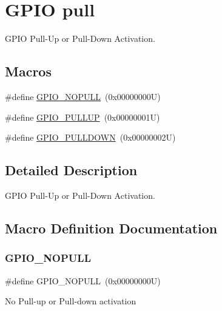 \hypertarget{group___g_p_i_o__pull}{}\section{G\+P\+IO pull}
\label{group___g_p_i_o__pull}


G\+P\+IO Pull-\/\+Up or Pull-\/\+Down Activation.  


\subsection*{Macros}
\begin{DoxyCompactItemize}
\item 
\#define \hyperlink{group___g_p_i_o__pull_ga5c2862579882c1cc64e36d38fbd07a4c}{G\+P\+I\+O\+\_\+\+N\+O\+P\+U\+LL}~(0x00000000\+U)
\item 
\#define \hyperlink{group___g_p_i_o__pull_gae689bc8f5c42d6df7bd54a8dd372e072}{G\+P\+I\+O\+\_\+\+P\+U\+L\+L\+UP}~(0x00000001\+U)
\item 
\#define \hyperlink{group___g_p_i_o__pull_ga75d958d0410c36da7f27d1f4f5c36c14}{G\+P\+I\+O\+\_\+\+P\+U\+L\+L\+D\+O\+WN}~(0x00000002\+U)
\end{DoxyCompactItemize}


\subsection{Detailed Description}
G\+P\+IO Pull-\/\+Up or Pull-\/\+Down Activation. 



\subsection{Macro Definition Documentation}
\mbox{\label{group___g_p_i_o__pull_ga5c2862579882c1cc64e36d38fbd07a4c}} 
\subsubsection{\texorpdfstring{G\+P\+I\+O\+\_\+\+N\+O\+P\+U\+LL}{GPIO\_NOPULL}}
{\footnotesize\ttfamily \#define G\+P\+I\+O\+\_\+\+N\+O\+P\+U\+LL~(0x00000000\+U)}

No Pull-\/up or Pull-\/down activation \mbox{\label{group___g_p_i_o__pull_ga75d958d0410c36da7f27d1f4f5c36c14}} 
